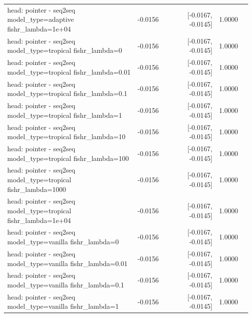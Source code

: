 \documentclass[10pt]{article}
\makeatletter
\newcommand{\stackcell}[1]{\begin{tabular}[t]{@{}l@{}}#1\end{tabular}}
\makeatother
\begin{document}
{\begin{longtable}{lrrrl}
\stackcell{head: pointer - seq2seq\\\footnotesize model\_type=adaptive fishr\_lambda=1e+04 } & -0.0156 & [-0.0167, -0.0145] & 1.0000 & \\
\stackcell{head: pointer - seq2seq\\\footnotesize model\_type=tropical fishr\_lambda=0 } & -0.0156 & [-0.0167, -0.0145] & 1.0000 & \\
\stackcell{head: pointer - seq2seq\\\footnotesize model\_type=tropical fishr\_lambda=0.01 } & -0.0156 & [-0.0167, -0.0145] & 1.0000 & \\
\stackcell{head: pointer - seq2seq\\\footnotesize model\_type=tropical fishr\_lambda=0.1 } & -0.0156 & [-0.0167, -0.0145] & 1.0000 & \\
\stackcell{head: pointer - seq2seq\\\footnotesize model\_type=tropical fishr\_lambda=1 } & -0.0156 & [-0.0167, -0.0145] & 1.0000 & \\
\stackcell{head: pointer - seq2seq\\\footnotesize model\_type=tropical fishr\_lambda=10 } & -0.0156 & [-0.0167, -0.0145] & 1.0000 & \\
\stackcell{head: pointer - seq2seq\\\footnotesize model\_type=tropical fishr\_lambda=100 } & -0.0156 & [-0.0167, -0.0145] & 1.0000 & \\
\stackcell{head: pointer - seq2seq\\\footnotesize model\_type=tropical fishr\_lambda=1000 } & -0.0156 & [-0.0167, -0.0145] & 1.0000 & \\
\stackcell{head: pointer - seq2seq\\\footnotesize model\_type=tropical fishr\_lambda=1e+04 } & -0.0156 & [-0.0167, -0.0145] & 1.0000 & \\
\stackcell{head: pointer - seq2seq\\\footnotesize model\_type=vanilla fishr\_lambda=0 } & -0.0156 & [-0.0167, -0.0145] & 1.0000 & \\
\stackcell{head: pointer - seq2seq\\\footnotesize model\_type=vanilla fishr\_lambda=0.01 } & -0.0156 & [-0.0167, -0.0145] & 1.0000 & \\
\stackcell{head: pointer - seq2seq\\\footnotesize model\_type=vanilla fishr\_lambda=0.1 } & -0.0156 & [-0.0167, -0.0145] & 1.0000 & \\
\stackcell{head: pointer - seq2seq\\\footnotesize model\_type=vanilla fishr\_lambda=1 } & -0.0156 & [-0.0167, -0.0145] & 1.0000 & \\

\end{longtable}}
\end{document}
